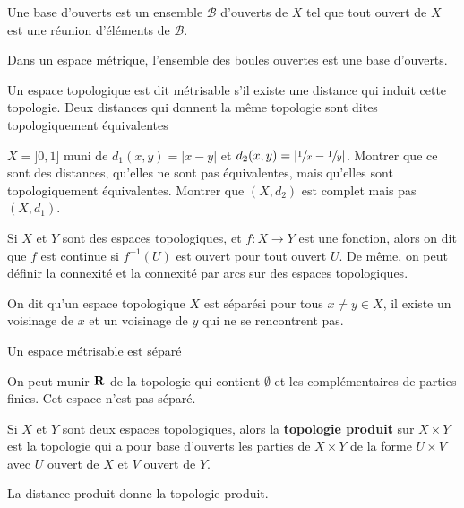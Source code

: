 \begin{dfn}
Une base d'ouverts est un ensemble $\mathcal  B$ d'ouverts de $X$ tel que tout ouvert de  $X$ est une réunion d'éléments de  $\mathcal  B$.
\end{dfn}

\begin{ex}
Dans un espace métrique, l'ensemble des boules ouvertes est une base d'ouverts.
\end{ex}

\begin{dfn}
    Un espace topologique est dit métrisable s'il existe une distance qui induit cette topologie. Deux distances qui donnent la même topologie sont dites topologiquement équivalentes
\end{dfn}

\begin{exo}
    $X=]0, 1]$ muni de  $d_1(x, y)=|x-y|$ et  $d_2(x, y)=|\sfrac1x-\sfrac1y|$. Montrer que ce sont des distances, qu'elles ne sont pas équivalentes, mais qu'elles sont topologiquement équivalentes. Montrer que $(X, d_2)$ est complet mais pas $(X, d_1)$.
\end{exo}

\begin{dfn}
    Si $X$ et  $Y$ sont des espaces topologiques, et  $f:X \longrightarrow Y$ est une fonction, alors on dit que $f$ est continue si  $f^{-1}(U)$ est ouvert pour tout ouvert $U$. De même, on peut définir la connexité et la connexité par arcs sur des espaces topologiques.
\end{dfn}

\begin{dfn}
On dit qu'un espace topologique $X$ est séparé\footnotemark si pour tous $x\neq y \in X$, il existe un voisinage de $x$ et un voisinage de $y$ qui ne se rencontrent pas.
\end{dfn}


\begin{ex}
Un espace métrisable est séparé
\end{ex}

\begin{ex}
On peut munir $\mathbf R$ de la topologie qui contient $\emptyset$ et les complémentaires de parties finies. Cet espace n'est pas séparé.
\end{ex}

\begin{dfn}
Si $X$ et $Y$ sont deux espaces topologiques, alors la \textbf{topologie produit}  sur $X \times Y$ est la topologie qui a pour base d'ouverts les parties de $X \times Y$ de la forme $U \times V$ avec $U$ ouvert de $X$ et $V$ ouvert de $Y$.
\end{dfn}

\begin{rem}
La distance produit donne la topologie produit.
\end{rem}
